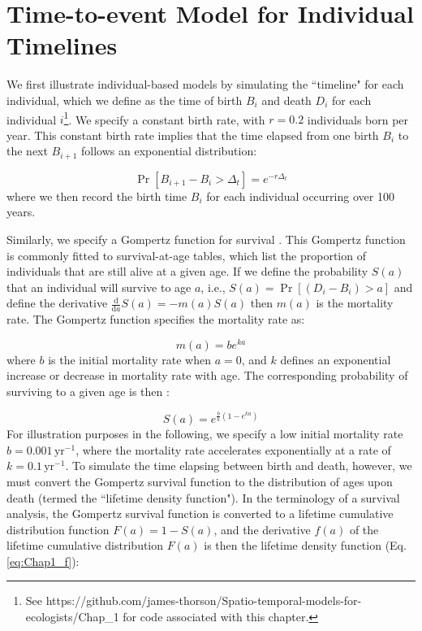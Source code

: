 \section{Time-to-event Model for Individual Timelines}\label{sec:Chap1_time_to_event}

We first illustrate individual-based models by simulating the ``timeline" for each individual, which we define as the time of birth \(B_i\) and death \(D_i\) for each individual \(i\)\footnote{See https://github.com/james-thorson/Spatio-temporal-models-for-ecologists/Chap\_1 for code associated with this chapter.}.  We specify a constant birth rate, with \(r=0.2\) individuals born per year. This constant birth rate implies that the time elapsed from one birth \(B_i\) to the next \(B_{i+1}\) follows an exponential distribution:

\begin{equation}
  \Pr[B_{i+1} - B_{i} > \Delta_t] = e^{-r \Delta_t}    
\end{equation}
where we then record the birth time \(B_i\) for each individual occurring over 100 years.  

Similarly, we specify a Gompertz function for survival \cite{gompertz_xxiv_1825}. This Gompertz function is commonly fitted to survival-at-age tables, which list the proportion of individuals that are still alive at a given age. If we define the probability \(S(a)\) that an individual will survive to age \(a\), i.e., \(S(a) = \Pr[(D_i-B_i) > a]\) and define the derivative \(\frac{\text{d}}{\text{d}a} S(a) = -m(a) S(a)\) then \(m(a)\) is the mortality rate.  The Gompertz function specifies the mortality rate as: 

\begin{equation}
  m(a) = b e^{ka}    
\end{equation}
where \(b\) is the initial mortality rate when \(a=0\), and \(k\) defines an exponential increase or decrease in mortality rate with age.  The corresponding probability of surviving to a given age is then \cite{wilson_analysis_1994}:

\begin{equation}
  S(a) = e^{\frac{b}{k} (1-e^{ka})}    
\end{equation}
For illustration purposes in the following, we specify a low initial mortality rate \(b=0.001 \,  \mathrm{yr}^{-1}\), where the mortality rate accelerates exponentially at a rate of \(k=0.1 \, \mathrm{yr}^{-1}\).  To simulate the time elapsing between birth and death, however, we must convert the Gompertz survival function to the distribution of ages upon death (termed the ``lifetime density function").  In the terminology of a survival analysis, the Gompertz survival function  is converted to a lifetime cumulative distribution function \(F(a) = 1-S(a)\), and the derivative \(f(a)\) of the lifetime cumulative distribution \(F(a)\) is then the lifetime density function (Eq. \ref{eq:Chap1_f}):

